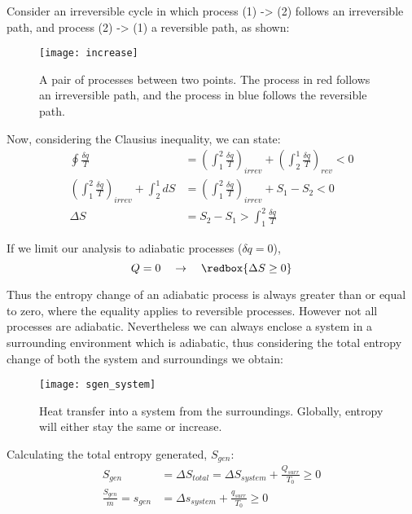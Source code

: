 Consider an irreversible cycle in which process (1) -> (2) follows an irreversible path, and process (2) -> (1) a reversible path, as shown:

\begin{figure}[H]
  \centering
  \texttt{[image: increase]}
  \caption{A pair of processes between two points.  The process in red follows an irreversible path, and the process in blue follows the reversible path.}
  \label{fig:increase}
\end{figure}

Now, considering the Clausius inequality, we can state:
\begin{align*}
  \oint \frac{\delta q}{T} &= \left(\int_1^2 \frac{\delta q}{T}\right)_{irrev} +\left(\int_2^1 \frac{\delta q}{T}\right)_{rev} < 0\\
  \left(\int_1^2 \frac{\delta q}{T}\right)_{irrev} + \int_2^1 dS &= \left(\int_1^2 \frac{\delta q}{T}\right)_{irrev} + S_1 - S_2 < 0 \\
  \Delta S &= S_2 - S_1 > \int_1^2 \frac{\delta q}{T}
\end{align*}

If we limit our analysis to adiabatic processes ($\delta q =0$),
\begin{equation*}
  Q = 0 \quad\rightarrow\quad \redbox{\Delta S \ge 0}
\end{equation*}

Thus the entropy change of an adiabatic process is always greater than or equal to zero, where the equality applies to reversible processes. However not all processes are adiabatic. Nevertheless we can always enclose a system in a surrounding environment which is adiabatic, thus considering the total entropy change of both the system and surroundings we obtain:

\begin{figure}[H]
  \centering
  \texttt{[image: sgen\_system]}
  \caption{Heat transfer into a system from the surroundings.  Globally, entropy will either stay the same or increase.}
  \label{fig:sgen_system}
\end{figure}

Calculating the total entropy generated, $S_{gen}$:
\begin{align*}
  S_{gen} &= \Delta S_{total} = \Delta S_{system} + \frac{Q_{surr}}{T_0} \ge 0 \\
  \frac{S_{gen}}{m} = s_{gen} &= \Delta s_{system} + \frac{q_{surr}}{T_0} \ge 0
\end{align*}

